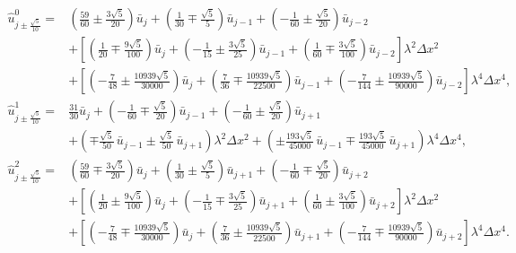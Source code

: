 \documentclass[12pt,a4paper]{article}
\numberwithin{equation}{section}    %
\begin{document}
\begin{equation}
    \label{eq:substencil_inner}
    \begin{aligned}
        \hat{u}^0_{j\pm\frac{\sqrt{5}}{10}}
        = & \left(\frac{59}{60} \pm \frac{3\sqrt{5}}{20}\right)\bar{u}_j
          + \left(\frac{1}{30} \mp \frac{\sqrt{5}}{5}\right)\bar{u}_{j-1}
          + \left(-\frac{1}{60} \pm \frac{\sqrt{5}}{20}\right)\bar{u}_{j-2} \\
          & + \left[\left(\frac{1}{20} \mp \frac{9\sqrt{5}}{100}\right)\bar{u}_j
            + \left(-\frac{1}{15} \pm \frac{3\sqrt{5}}{25}\right)\bar{u}_{j-1}
            + \left(\frac{1}{60} \mp \frac{3\sqrt{5}}{100}\right)\bar{u}_{j-2}\right]\lambda^2\Delta x^2 \\
          & + \left[\left(-\frac{7}{48} \pm \frac{10939\sqrt{5}}{30000}\right)\bar{u}_j
            + \left(\frac{7}{36} \mp \frac{10939\sqrt{5}}{22500}\right)\bar{u}_{j-1}
            + \left(-\frac{7}{144} \pm \frac{10939\sqrt{5}}{90000}\right)\bar{u}_{j-2}\right]\lambda^4\Delta x^4, \\[6pt]
        \hat{u}^1_{j\pm\frac{\sqrt{5}}{10}}
        = & \frac{31}{30}\bar{u}_j
          + \left(-\frac{1}{60} \mp \frac{\sqrt{5}}{20}\right)\bar{u}_{j-1}
          + \left(-\frac{1}{60} \pm \frac{\sqrt{5}}{20}\right)\bar{u}_{j+1} \\
          & + \left(\mp\frac{\sqrt{5}}{50}\,\bar{u}_{j-1}
            \pm\frac{\sqrt{5}}{50}\,\bar{u}_{j+1}\right)\lambda^2\Delta x^2
          + \left(\pm\frac{193\sqrt{5}}{45000}\,\bar{u}_{j-1}
            \mp\frac{193\sqrt{5}}{45000}\,\bar{u}_{j+1}\right)\lambda^4\Delta x^4, \\[6pt]
        \hat{u}^2_{j\pm\frac{\sqrt{5}}{10}}
        = & \left(\frac{59}{60} \mp \frac{3\sqrt{5}}{20}\right)\bar{u}_j
          + \left(\frac{1}{30} \pm \frac{\sqrt{5}}{5}\right)\bar{u}_{j+1}
          + \left(-\frac{1}{60} \mp \frac{\sqrt{5}}{20}\right)\bar{u}_{j+2} \\
          & + \left[\left(\frac{1}{20} \pm \frac{9\sqrt{5}}{100}\right)\bar{u}_j
            + \left(-\frac{1}{15} \mp \frac{3\sqrt{5}}{25}\right)\bar{u}_{j+1}
            + \left(\frac{1}{60} \pm \frac{3\sqrt{5}}{100}\right)\bar{u}_{j+2}\right]\lambda^2\Delta x^2 \\
          & + \left[\left(-\frac{7}{48} \mp \frac{10939\sqrt{5}}{30000}\right)\bar{u}_j
            + \left(\frac{7}{36} \pm \frac{10939\sqrt{5}}{22500}\right)\bar{u}_{j+1}
            + \left(-\frac{7}{144} \mp \frac{10939\sqrt{5}}{90000}\right)\bar{u}_{j+2}\right]\lambda^4\Delta x^4.
    \end{aligned}
\end{equation}
\end{document}
